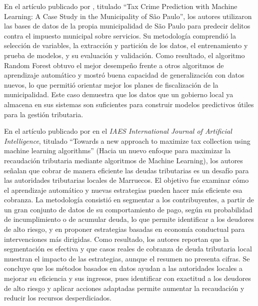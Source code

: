 \documentclass[12pt,a4paper]{report}
\begin{document}
En el artículo publicado por \textcite{ippolito2020}, titulado ``Tax Crime Prediction with Machine Learning: A Case Study in the Municipality of São Paulo'', los autores utilizaron las bases de datos de la propia municipalidad de São Paulo para predecir delitos contra el impuesto municipal sobre servicios. Su metodología comprendió la selección de variables, la extracción y partición de los datos, el entrenamiento y prueba de modelos, y su evaluación y validación. Como resultado, el algoritmo Random Forest obtuvo el mejor desempeño frente a otros algoritmos de aprendizaje automático y mostró buena capacidad de generalización con datos nuevos, lo que permitió orientar mejor los planes de fiscalización de la municipalidad. Este caso demuestra que los datos que un gobierno local ya almacena en sus sistemas son suficientes para construir modelos predictivos útiles para la gestión tributaria.

En el artículo publicado por \textcite{ourdani2024} en el \textit{IAES International Journal of Artificial Intelligence}, titulado ``Towards a new approach to maximize tax collection using machine learning algorithms'' (Hacia un nuevo enfoque para maximizar la recaudación tributaria mediante algoritmos de Machine Learning), los autores señalan que cobrar de manera eficiente las deudas tributarias es un desafío para las autoridades tributarias locales de Marruecos. El objetivo fue examinar cómo el aprendizaje automático y nuevas estrategias pueden hacer más eficiente esa cobranza. La metodología consistió en segmentar a los contribuyentes, a partir de un gran conjunto de datos de su comportamiento de pago, según su probabilidad de incumplimiento o de acumular deuda, lo que permite identificar a los deudores de alto riesgo, y en proponer estrategias basadas en economía conductual para intervenciones más dirigidas. Como resultado, los autores reportan que la segmentación es efectiva y que casos reales de cobranza de deuda tributaria local muestran el impacto de las estrategias, aunque el resumen no presenta cifras. Se concluye que los métodos basados en datos ayudan a las autoridades locales a mejorar su eficiencia y sus ingresos, pues identificar con exactitud a los deudores de alto riesgo y aplicar acciones adaptadas permite aumentar la recaudación y reducir los recursos desperdiciados.
\end{document}
